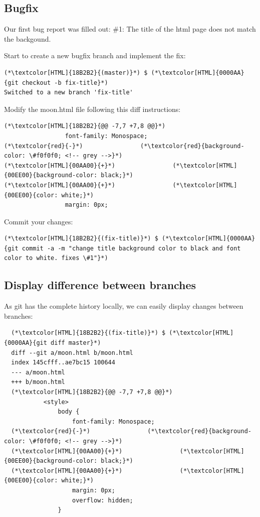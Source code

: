 \subsection{Bugfix}
\begin{frame}[fragile]
    \subslidetitle

  Our first bug report was filled out:
  \newline \vspace{1em}
  \#1: The title of the html page does not match the backgound.

  Start to create a new bugfix branch and implement the fix:
  \begin{lstlisting}
(*\textcolor[HTML]{18B2B2}{(master)}*) $ (*\textcolor[HTML]{0000AA}{git checkout -b fix-title}*)
Switched to a new branch 'fix-title'
\end{lstlisting}

  Modify the moon.html file following this diff instructions:
  \begin{lstlisting}
(*\textcolor[HTML]{18B2B2}{@@ -7,7 +7,8 @@}*)
                 font-family: Monospace;
(*\textcolor{red}{-}*)                (*\textcolor{red}{background-color: \#f0f0f0; <!-- grey -->}*)
(*\textcolor[HTML]{00AA00}{+}*)                (*\textcolor[HTML]{00EE00}{background-color: black;}*)
(*\textcolor[HTML]{00AA00}{+}*)                (*\textcolor[HTML]{00EE00}{color: white;}*)
                 margin: 0px;
\end{lstlisting}

  Commit your changes:
  \begin{lstlisting}
(*\textcolor[HTML]{18B2B2}{(fix-title)}*) $ (*\textcolor[HTML]{0000AA}{git commit -a -m "change title background color to black and font color to white. fixes \#1"}*)
\end{lstlisting}
\end{frame}

\subsection{Display difference between branches}
\begin{frame}[fragile]
  \subslidetitle

  As git has the complete history locally, we can easily display changes between branches:

  \begin{lstlisting}
  (*\textcolor[HTML]{18B2B2}{(fix-title)}*) $ (*\textcolor[HTML]{0000AA}{git diff master}*)
  diff --git a/moon.html b/moon.html
  index 145cfff..ae7bc15 100644
  --- a/moon.html
  +++ b/moon.html
  (*\textcolor[HTML]{18B2B2}{@@ -7,7 +7,8 @@}*)
           <style>
               body {
                   font-family: Monospace;
  (*\textcolor{red}{-}*)                (*\textcolor{red}{background-color: \#f0f0f0; <!-- grey -->}*)
  (*\textcolor[HTML]{00AA00}{+}*)                (*\textcolor[HTML]{00EE00}{background-color: black;}*)
  (*\textcolor[HTML]{00AA00}{+}*)                (*\textcolor[HTML]{00EE00}{color: white;}*)
                   margin: 0px;
                   overflow: hidden;
               }
\end{lstlisting}
\end{frame}

